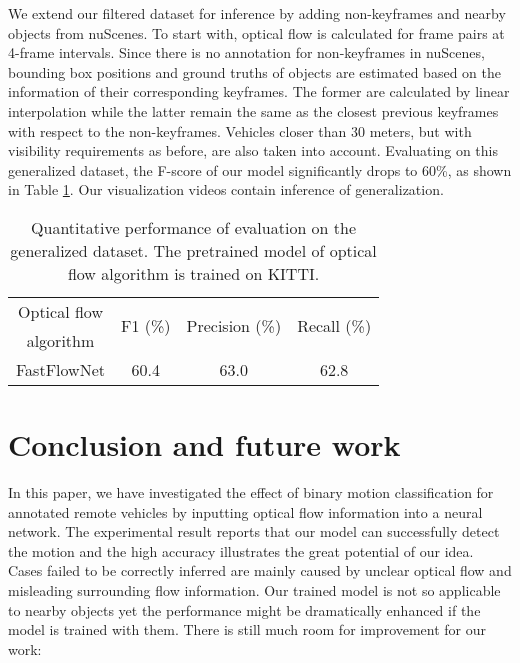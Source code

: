 \documentclass[10pt, a4paper, twocolumn]{article}
\begin{document}
    We extend our filtered dataset for inference by adding non-keyframes and nearby objects from nuScenes. To start with, optical flow is calculated for frame pairs at 4-frame intervals. Since there is no annotation for non-keyframes in nuScenes, bounding box positions and ground truths of objects are estimated based on the information of their corresponding keyframes. The former are calculated by linear interpolation while the latter remain the same as the closest previous keyframes with respect to the non-keyframes. Vehicles closer than 30 meters, but with visibility requirements as before, are also taken into account. Evaluating on this generalized dataset, the F-score of our model significantly drops to 60\%, as shown in Table \ref{tab:generalization}. Our visualization videos contain inference of generalization.
    
    \begin{table}[h!]
    \caption{Quantitative performance of evaluation on the generalized dataset. The pretrained model of optical flow algorithm is trained on KITTI.}
    \label{tab:generalization}
    \centering
    \begin{tabular}{c c c c}
        \hline
        Optical flow & \multirow{2}{3.5em}{\centering F1 (\%)} & \multirow{2}{6em}{\centering Precision (\%)} & \multirow{2}{5em}{\centering Recall (\%)} \\ algorithm & \\
        \hline\hline    
        FastFlowNet & 60.4 & 63.0 & 62.8 \\
        \hline
    \end{tabular}
    \end{table}


\section{\large Conclusion and future work}

    In this paper, we have investigated the effect of binary motion classification for annotated remote vehicles by inputting optical flow information into a neural network. The experimental result reports that our model can successfully detect the motion and the high accuracy illustrates the great potential of our idea. Cases failed to be correctly inferred are mainly caused by unclear optical flow and misleading surrounding flow information. Our trained model is not so applicable to nearby objects yet the performance might be dramatically enhanced if the model is trained with them. There is still much room for improvement for our work:
    
\end{document}
